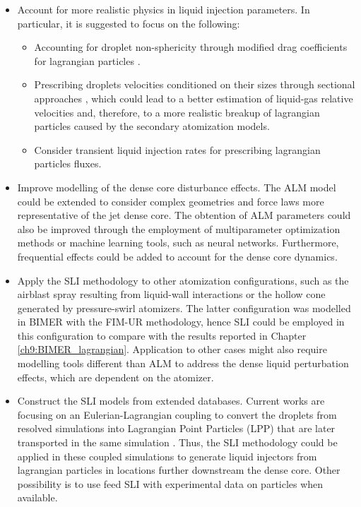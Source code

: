 \begin{itemize}

	\item Account for more realistic physics in liquid injection parameters. In particular, it is suggested to focus on the following:
	
	\begin{itemize}
	
		\item Accounting for droplet non-sphericity through modified drag coefficients for lagrangian particles .
		
		\item Prescribing droplets velocities conditioned on their sizes through sectional approaches , which could lead to a better estimation of liquid-gas relative velocities and, therefore, to a more realistic breakup of lagrangian particles caused by the secondary atomization models.
		
		\item Consider transient liquid injection rates for prescribing lagrangian particles fluxes.
	
	\end{itemize}
	
	\item Improve modelling of the dense core disturbance effects. The ALM model could be extended to consider complex geometries and force laws more representative of the jet dense core. The obtention of ALM parameters could also be improved through the employment of multiparameter optimization methods or machine learning tools, such as neural networks. Furthermore, frequential effects could be added to account for the dense core dynamics.
	
	\item Apply the SLI methodology to other atomization configurations, such as the airblast spray resulting from liquid-wall interactions or the hollow cone generated by pressure-swirl atomizers. The latter configuration was modelled in BIMER with the FIM-UR methodology, hence SLI could be employed in this configuration to compare with the results reported in Chapter \ref{ch9:BIMER_lagrangian}. Application to other cases might also require modelling tools different than ALM to address the dense liquid perturbation effects, which are dependent on the atomizer. 
	
	\item Construct the SLI models from extended databases. Current works are focusing on an Eulerian-Lagrangian coupling to convert the droplets from resolved simulations into Lagrangian Point Particles (LPP) that are later transported in the same simulation . Thus, the SLI methodology could be applied in these coupled simulations to generate liquid injectors from lagrangian particles in locations further downstream the dense core. Other possibility is to use feed SLI with experimental data on particles when available.  
	

\end{itemize}
